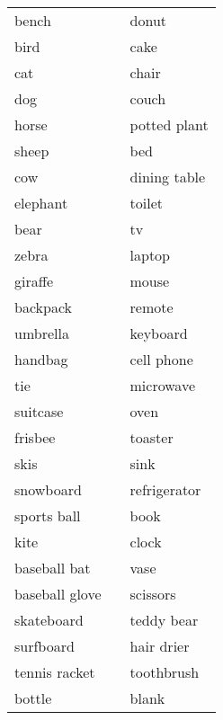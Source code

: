 \begin{appendices}
\begin{table}
\begin{tabular}{|l|L{3cm}|l|}
bench            & & donut           \\  
bird             & & cake            \\  
cat              & & chair           \\  
dog              & & couch           \\  
horse            & & potted plant    \\  
sheep            & & bed             \\  
cow              & & dining table    \\  
elephant         & & toilet          \\  
bear             & & tv              \\  
zebra            & & laptop          \\  
giraffe          & & mouse           \\  
backpack         & & remote          \\  
umbrella         & & keyboard        \\  
handbag          & & cell phone      \\  
tie              & & microwave       \\  
suitcase         & & oven            \\  
frisbee          & & toaster         \\  
skis             & & sink            \\  
snowboard        & & refrigerator    \\  
sports ball      & & book            \\  
kite             & & clock           \\  
baseball bat     & & vase            \\  
baseball glove   & & scissors        \\  
skateboard       & & teddy bear      \\  
surfboard        & & hair drier      \\  
tennis racket    & & toothbrush      \\  
bottle           & & blank           \\  
\end{tabular}
\end{table}
\end{appendices}